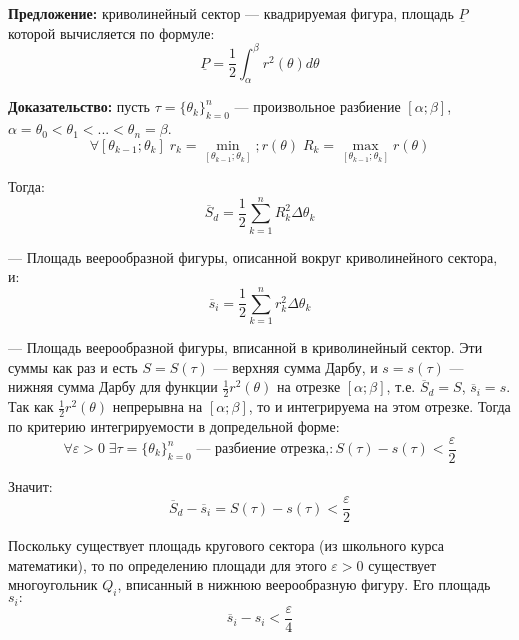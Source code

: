 \documentclass{article}
\begin{document}
  \textbf{Предложение:} криволинейный сектор --- квадрируемая фигура, площадь $\underline P$ которой вычисляется по формуле:
  \begin{equation}
    \underline P=\frac{1}{2}\int_\alpha^\beta r^2(\theta)d\theta
  \end{equation}
  
  \textbf{Доказательство:} пусть $\tau=\{\theta_k\}_{k=0}^n$ --- произвольное разбиение $[\alpha;\beta]$, $\alpha=\theta_0<\theta_1<...<\theta_n=\beta$.
  \begin{equation}
    \forall[\theta_{k-1};\theta_k]\;r_k=\min_{[\theta_{k-1};\theta_k]}; r(\theta)\; R_k=\max_{[\theta_{k-1};\theta_k]} r(\theta)
  \end{equation}
  
  Тогда:
  \begin{equation}
    \overline S_d=\frac{1}{2}\sum_{k=1}^nR_k^2\Delta\theta_k
  \end{equation}
  
  --- Площадь веерообразной фигуры, описанной вокруг криволинейного сектора, и:
  \begin{equation}
    \overline s_i=\frac{1}{2}\sum_{k=1}^nr_k^2\Delta\theta_k
  \end{equation}  
  
  --- Площадь веерообразной фигуры, вписанной в криволинейный сектор. Эти суммы как раз и есть $S=S(\tau)$ --- верхняя сумма Дарбу, и $s=s(\tau)$ --- нижняя сумма Дарбу для функции $\frac{1}{2}r^2(\theta)$ на отрезке $[\alpha;\beta]$, т.е. $\overline S_d=S$, $\overline s_i=s$.\\
  
  Так как $\frac{1}{2}r^2(\theta)$ непрерывна на $[\alpha;\beta]$, то и интегрируема на этом отрезке. Тогда по критерию интегрируемости в допредельной форме:
  \begin{equation}
    \forall\varepsilon>0\;\exists\tau=\{\theta_k\}_{k=0}^n \text{ --- разбиение отрезка,}:S(\tau)-s(\tau)<\frac{\varepsilon}{2}
  \end{equation}
  
  Значит:
  \begin{equation}
    \overline S_d-\overline s_i=S(\tau)-s(\tau)<\frac{\varepsilon}{2}
  \end{equation}
  
  Поскольку существует площадь кругового сектора (из школьного курса математики), то по определению площади для этого $\varepsilon>0$ существует многоугольник $Q_i$, вписанный в нижнюю веерообразную фигуру. Его площадь $s_i:$
  \begin{equation}
    \overline s_i-s_i<\frac{\varepsilon}{4}
  \end{equation}
  
\end{document}
